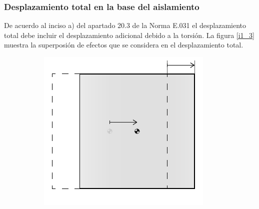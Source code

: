 \subsubsection{Desplazamiento total en la base del aislamiento}
De acuerdo al inciso a) del apartado 20.3 de la Norma E.031\supercite{E031.4} el desplazamiento total debe incluir el desplazamiento adicional debido a la torsión. La figura \ref{i1_3} muestra la superposión de efectos que se considera en el desplazamiento total.
\newpage
\begin{figure}[h!]
    \centering
    \begin{subfigure}[b]{0.30\linewidth}
        \centering
        \includegraphics[width = \linewidth]{img/1-CAP/DM_1.pdf}
        \caption{}
        \label{i1_3.1}
    \end{subfigure}
    \hfill
    \begin{subfigure}[b]{0.30\linewidth}
        \centering

\end{subfigure}
\end{figure}
